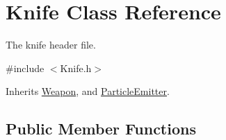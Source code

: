 \hypertarget{class_knife}{\section{Knife Class Reference}
\label{class_knife}
}


The knife header file.  




{\ttfamily \#include $<$Knife.\+h$>$}



Inherits \hyperlink{class_weapon}{Weapon}, and \hyperlink{class_particle_emitter}{Particle\+Emitter}.

\subsection*{Public Member Functions}
